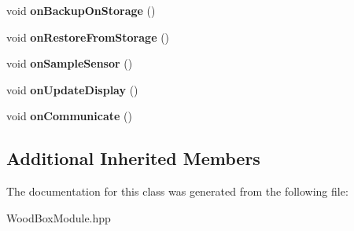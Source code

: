 \begin{DoxyCompactItemize}
\mbox{\label{classwood_box_1_1module_1_1_wood_box_module_a28c9b89bc3429d6e78fa38698c78d553}} 
void {\bfseries on\+Backup\+On\+Storage} ()
\item 
\mbox{\label{classwood_box_1_1module_1_1_wood_box_module_a89395caa73cadc63c576931b45400c2d}} 
void {\bfseries on\+Restore\+From\+Storage} ()
\item 
\mbox{\label{classwood_box_1_1module_1_1_wood_box_module_a227e8b23e8435f622f4d59eb6847e98b}} 
void {\bfseries on\+Sample\+Sensor} ()
\item 
\mbox{\label{classwood_box_1_1module_1_1_wood_box_module_a1461bd1a53529065541c87fc03a28f57}} 
void {\bfseries on\+Update\+Display} ()
\item 
\mbox{\label{classwood_box_1_1module_1_1_wood_box_module_acacb4ac748c70bd1f172d9a87e07dfbf}} 
void {\bfseries on\+Communicate} ()
\end{DoxyCompactItemize}
\subsection*{Additional Inherited Members}


The documentation for this class was generated from the following file\+:\begin{DoxyCompactItemize}
\item 
Wood\+Box\+Module.\+hpp\end{DoxyCompactItemize}
